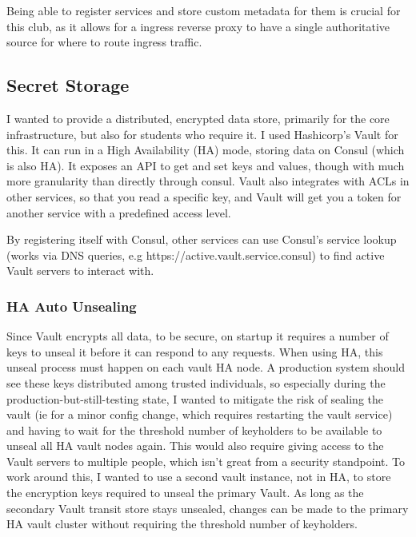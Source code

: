 \documentclass{article}
\begin{document}
Being able to register services and store custom metadata for them is crucial for this club, as it allows for a ingress reverse proxy to have a single authoritative source for where to route ingress traffic.
\subsection{Secret Storage}
I wanted to provide a distributed, encrypted data store, primarily for the core infrastructure, but also for students who require it. I used Hashicorp's Vault for this. It can run in a High Availability (HA) mode, storing data on Consul (which is also HA). It exposes an API to get and set keys and values, though with much more granularity than directly through consul. Vault also integrates with ACLs in other services, so that you read a specific key, and Vault will get you a token for another service with a predefined access level. 

By registering itself with Consul, other services can use Consul's service lookup (works via DNS queries, e.g https://active.vault.service.consul) to find active Vault servers to interact with.
\subsubsection{HA Auto Unsealing}
Since Vault encrypts all data, to be secure, on startup it requires a number of keys to unseal it before it can respond to any requests. When using HA, this unseal process must happen on each vault HA node. A production system should see these keys distributed among trusted individuals, so especially during the production-but-still-testing state, I wanted to mitigate the risk of sealing the vault (ie for a minor config change, which requires restarting the vault service) and having to wait for the threshold number of keyholders to be available to unseal all HA vault nodes again. This would also require giving access to the Vault servers to multiple people, which isn't great from a security standpoint. To work around this, I wanted to use a second vault instance, not in HA, to store the encryption keys required to unseal the primary Vault. As long as the secondary Vault transit store stays unsealed, changes can be made to the primary HA vault cluster without requiring the threshold number of keyholders.
\end{document}
